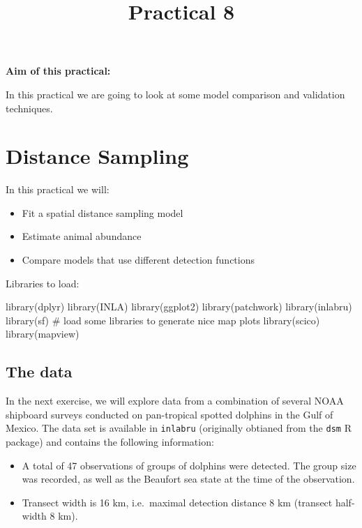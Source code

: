 \documentclass[
  letterpaper,
  DIV=11,
  numbers=noendperiod]{scrartcl}
\title{Practical 8}
\author{}
\date{}
\makeatletter
\newenvironment{Shaded}{\begin{snugshade}}{\end{snugshade}}
\newcommand{\CommentTok}[1]{\textcolor[rgb]{0.37,0.37,0.37}{#1}}
\newcommand{\FunctionTok}[1]{\textcolor[rgb]{0.28,0.35,0.67}{#1}}
\newcommand{\NormalTok}[1]{\textcolor[rgb]{0.00,0.23,0.31}{#1}}
\providecommand{\tightlist}{%
  \setlength{\itemsep}{0pt}\setlength{\parskip}{0pt}}\usepackage{longtable,booktabs,array}
\renewcommand{\maketitle}{\bgroup\setlength{\parindent}{0pt}
\begin{flushleft}
  {\sffamily\huge\textbf{\MakeUppercase{\@title}}} \vspace{0.3cm} \newline
  {\Large {\@subtitle}} \newline
  \@author
\end{flushleft}\egroup
}
\makeatother
\begin{document}
\maketitle

\pagestyle{mystyle}


\textbf{Aim of this practical:}

In this practical we are going to look at some model comparison and
validation techniques.

\section{Distance Sampling}\label{distance-sampling}

In this practical we will:

\begin{itemize}
\tightlist
\item
  Fit a spatial distance sampling model
\item
  Estimate animal abundance
\item
  Compare models that use different detection functions
\end{itemize}

Libraries to load:

\begin{Shaded}
\begin{Highlighting}[]
\FunctionTok{library}\NormalTok{(dplyr)}
\FunctionTok{library}\NormalTok{(INLA)}
\FunctionTok{library}\NormalTok{(ggplot2)}
\FunctionTok{library}\NormalTok{(patchwork)}
\FunctionTok{library}\NormalTok{(inlabru)     }
\FunctionTok{library}\NormalTok{(sf)}
\CommentTok{\# load some libraries to generate nice map plots}
\FunctionTok{library}\NormalTok{(scico)}
\FunctionTok{library}\NormalTok{(mapview)}
\end{Highlighting}
\end{Shaded}

\subsection{The data}\label{the-data}

In the next exercise, we will explore data from a combination of several
NOAA shipboard surveys conducted on pan-tropical spotted dolphins in the
Gulf of Mexico. The data set is available in \texttt{inlabru}
(originally obtianed from the \texttt{dsm} R package) and contains the
following information:

\begin{itemize}
\item
  A total of 47 observations of groups of dolphins were detected. The
  group size was recorded, as well as the Beaufort sea state at the time
  of the observation.
\item
  Transect width is 16 km, i.e.~maximal detection distance 8 km
  (transect half-width 8 km).
\end{itemize}
\end{document}

